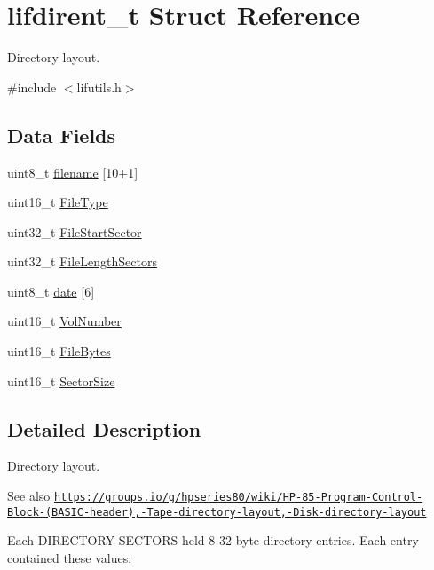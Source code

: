 \hypertarget{structlifdirent__t}{}\section{lifdirent\+\_\+t Struct Reference}
\label{structlifdirent__t}


Directory layout.  




{\ttfamily \#include $<$lifutils.\+h$>$}

\subsection*{Data Fields}
\begin{DoxyCompactItemize}
\item 
uint8\+\_\+t \hyperlink{structlifdirent__t_ac0d5353d2e81494997b15597377de032}{filename} \mbox{[}10+1\mbox{]}
\item 
uint16\+\_\+t \hyperlink{structlifdirent__t_a48901a6b2b10471927397b3b569e386a}{File\+Type}
\item 
uint32\+\_\+t \hyperlink{structlifdirent__t_a87df04d1aa76daa4b9500f2f2e44ecaa}{File\+Start\+Sector}
\item 
uint32\+\_\+t \hyperlink{structlifdirent__t_a0770652809bb32a115c7f30035a13208}{File\+Length\+Sectors}
\item 
uint8\+\_\+t \hyperlink{structlifdirent__t_a6ef6cc281858e9d0de62c6a9ab5b432e}{date} \mbox{[}6\mbox{]}
\item 
uint16\+\_\+t \hyperlink{structlifdirent__t_a9510c4f024400cff22c8abb54a4aca65}{Vol\+Number}
\item 
uint16\+\_\+t \hyperlink{structlifdirent__t_a66e5f440e3a192df59c623faa2d01dbd}{File\+Bytes}
\item 
uint16\+\_\+t \hyperlink{structlifdirent__t_a4c2a8fab6d73c7f1baa502c1ebef8658}{Sector\+Size}
\end{DoxyCompactItemize}


\subsection{Detailed Description}
Directory layout. 

\begin{DoxySeeAlso}{See also}
\href{https://groups.io/g/hpseries80/wiki/HP-85-Program-Control-Block-(BASIC-header),-Tape-directory-layout,-Disk-directory-layout}{\tt https\+://groups.\+io/g/hpseries80/wiki/\+H\+P-\/85-\/\+Program-\/\+Control-\/\+Block-\/(\+B\+A\+S\+I\+C-\/header),-\/\+Tape-\/directory-\/layout,-\/\+Disk-\/directory-\/layout}
\end{DoxySeeAlso}
Each D\+I\+R\+E\+C\+T\+O\+RY S\+E\+C\+T\+O\+RS held 8 32-\/byte directory entries. Each entry contained these values\+:

